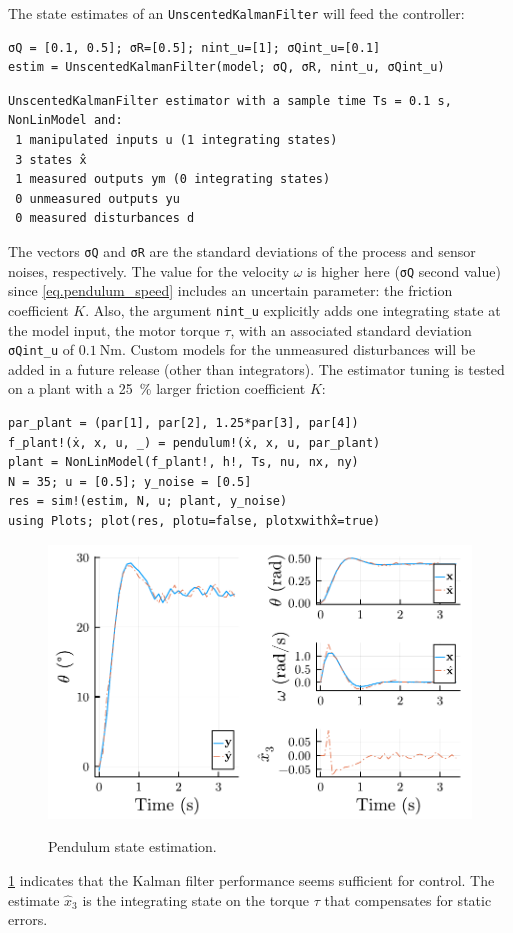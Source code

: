 The state estimates of an \texttt{UnscentedKalmanFilter} will feed the controller:
\begin{verbatim}
σQ = [0.1, 0.5]; σR=[0.5]; nint_u=[1]; σQint_u=[0.1]
estim = UnscentedKalmanFilter(model; σQ, σR, nint_u, σQint_u)
\end{verbatim}
\spacerepl
\begin{verbatim}
UnscentedKalmanFilter estimator with a sample time Ts = 0.1 s, NonLinModel and:
 1 manipulated inputs u (1 integrating states)
 3 states x̂
 1 measured outputs ym (0 integrating states)
 0 unmeasured outputs yu
 0 measured disturbances d
\end{verbatim}
The vectors \texttt{σQ} and \texttt{σR} are the standard deviations of the process and sensor noises, respectively. The value for the velocity $\omega$ is higher here (\texttt{σQ} second value) since \eqref{eq.pendulum_speed} includes an uncertain parameter: the friction coefficient $K$. Also, the argument \texttt{nint\_u} explicitly adds one integrating state at the model input, the motor torque $\tau$, with an associated standard deviation \texttt{σQint\_u} of $\SI{0.1}{\newton\meter}$. Custom models for the unmeasured disturbances will be added in a future release (other than integrators). The estimator tuning is tested on a plant with a \SI{25}{\percent} larger friction coefficient $K$: 
\begin{verbatim}
par_plant = (par[1], par[2], 1.25*par[3], par[4])
f_plant!(ẋ, x, u, _) = pendulum!(ẋ, x, u, par_plant)
plant = NonLinModel(f_plant!, h!, Ts, nu, nx, ny)
N = 35; u = [0.5]; y_noise = [0.5]
res = sim!(estim, N, u; plant, y_noise)
using Plots; plot(res, plotu=false, plotxwithx̂=true)
\end{verbatim}

\begin{figure}[h]
    \centering
    \caption{Pendulum state estimation.}
    \includegraphics[width=0.5\columnwidth]{fig/plot_NonLinMPC1.pdf}
    \label{fig:plot_NonLinMPC1}
\end{figure}

\cref{fig:plot_NonLinMPC1} indicates that the Kalman filter performance seems sufficient for control. The estimate $\hat{x}_3$ is the integrating state on the torque $\tau$ that compensates for static errors. 

